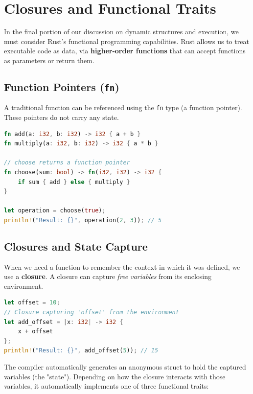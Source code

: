 \section{Closures and Functional Traits}

In the final portion of our discussion on dynamic structures and execution, we must consider Rust's functional programming capabilities. Rust allows us to treat executable code as data, via \textbf{higher-order functions} that can accept functions as parameters or return them.

\subsection{Function Pointers (\texttt{fn})}
A traditional function can be referenced using the \texttt{fn} type (a function pointer). These pointers do not carry any state.

\begin{lstlisting}[language=Rust]
fn add(a: i32, b: i32) -> i32 { a + b }
fn multiply(a: i32, b: i32) -> i32 { a * b }

// choose returns a function pointer
fn choose(sum: bool) -> fn(i32, i32) -> i32 {
    if sum { add } else { multiply }
}

let operation = choose(true);
println!("Result: {}", operation(2, 3)); // 5
\end{lstlisting}

\subsection{Closures and State Capture}
When we need a function to remember the context in which it was defined, we use a \textbf{closure}. A closure can capture \emph{free variables} from its enclosing environment.

\begin{lstlisting}[language=Rust]
let offset = 10;
// Closure capturing 'offset' from the environment
let add_offset = |x: i32| -> i32 {
    x + offset 
};
println!("Result: {}", add_offset(5)); // 15
\end{lstlisting}


The compiler automatically generates an anonymous struct to hold the captured variables (the "state"). Depending on how the closure interacts with those variables, it automatically implements one of three functional traits:

